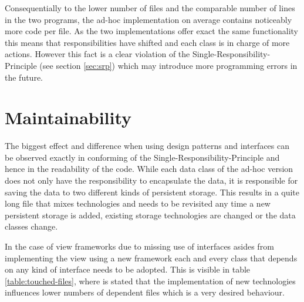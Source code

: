 Consequentially to the lower number of files and the comparable number of lines in the two programs, the ad-hoc implementation on average contains noticeably more code per file. As the two implementations offer exact the same functionality this means that responsibilities have shifted and each class is in charge of more actions. However this fact is a clear violation of the Single-Responsibility-Principle (see section \ref{sec:srp}) which may introduce more programming errors in the future. 

\section{Maintainability}
The biggest effect and difference when using design patterns and interfaces can be observed exactly in conforming of the Single-Responsibility-Principle and hence in the readability of the code. While each data class of the ad-hoc version does not only have the responsibility to encapsulate the data, it is responsible for saving the data to two different kinds of persistent storage. This results in a quite long file that mixes technologies and needs to be revisited any time a new persistent storage is added, existing storage technologies are changed or the data classes change. 

In the case of view frameworks due to missing use of interfaces asides from implementing the view using a new framework each and every class that depends on any kind of interface needs to be adopted. This is visible in table \ref{table:touched-files}, where is stated that the implementation of new technologies influences lower numbers of dependent files which is a very desired behaviour. 